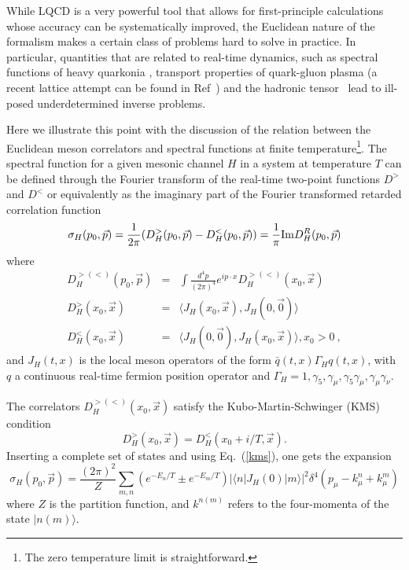 \documentclass[11pt]{article}
\begin{document}
While LQCD is a very powerful tool that allows for first-principle
calculations whose accuracy can be systematically improved,
the Euclidean nature of the formalism makes a certain class of problems
hard to solve in practice. In particular, quantities that are related
to real-time dynamics, such as spectral functions of heavy quarkonia
\cite{Bazavov:2009us},
transport properties of quark-gluon plasma (a recent lattice attempt can be found
in Ref~\cite{Pasztor:2018yae})
and the hadronic tensor~\cite{Liang:2017mye}
lead to ill-posed underdetermined
inverse problems.

Here we illustrate this point with the discussion of
the relation between the
Euclidean meson correlators and spectral functions at finite
temperature\footnote{The zero temperature limit is straightforward.}.
The spectral function for a given
mesonic channel $H$ in a system at temperature $T$ can be defined
through the Fourier transform of the real-time two-point functions
$D^{>}$ and $D^{<}$ or equivalently as the imaginary part of
the Fourier transformed retarded
correlation function \cite{Bellac:2011kqa}
\begin{equation}
\sigma_H(p_0,\vec{p}) =
\frac{1}{2 \pi} (D^{>}_H(p_0, \vec{p})-D^{<}_H(p_0, \vec{p}))
=\frac{1}{\pi} {\rm Im} D^R_H(p_0, \vec{p}) \label{eq.defspect_1} 
\end{equation}
where
\begin{eqnarray}
D^{>(<)}_H(p_0, \vec{p}) &=& \int\frac{d^4 p}{(2
\pi)^4} e^{i p \cdot x} D^{>(<)}_H(x_0,\vec{x}) \label{eq.defspect} \\
D^{>}_H(x_0,\vec{x}) &=& \langle
J_H(x_0, \vec{x}), J_H(0, \vec{0}) \rangle \nonumber\\
D^{<}_H(x_0,\vec{x}) &=&
\langle J_H(0, \vec{0}), J_H(x_0,\vec{x}) \rangle , x_0>0 \ ,
\end{eqnarray}
and $J_H(t,x)$ is the local meson operators of the form
$\bar q(t,x) \Gamma_H q(t,x)$, 
with $q$ a continuous real-time fermion position operator and
$\Gamma_H=1,\gamma_5, \gamma_{\mu}, \gamma_5 \gamma_{\mu}, \gamma_{\mu} \gamma_{\nu}$.

The correlators $D^{>(<)}_H(x_0,\vec{x})$ satisfy the
Kubo-Martin-Schwinger
(KMS) condition \cite{Bellac:2011kqa}
\begin{equation}
D^{>}_H(x_0,\vec{x})=D^{<}_H(x_0+i/T,\vec{x}).
\label{kms}
\end{equation}
Inserting a complete set of
states and using Eq.~(\ref{kms}), one gets the expansion
\begin{equation}
\sigma_H(p_0,\vec{p}) 
= \frac{(2 \pi)^2}{Z} \sum_{m,n} (e^{-E_n / T} \pm e^{-E_m / T})
|\langle n | J_H(0) | m \rangle|^2 \delta^4(p_\mu - k^n_\mu + k^m_\mu)
\label{eq.specdef}
\end{equation}
where $Z$ is the partition function, and
$k^{n(m)}$ refers to the four-momenta of the state $| n (m) \rangle $.
\end{document}
